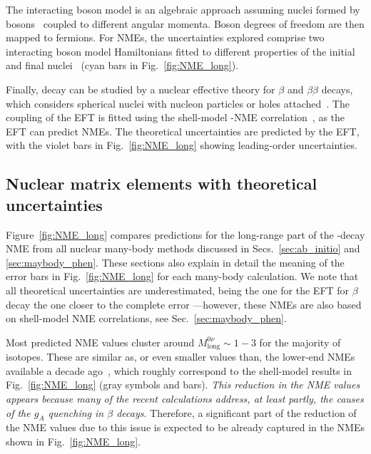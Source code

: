 The interacting boson model is an algebraic approach assuming nuclei formed by bosons~\cite{Iachello:2006fqa} coupled to different angular momenta. Boson degrees of freedom are then mapped to fermions. For NMEs, the uncertainties explored comprise two interacting boson model Hamiltonians fitted to different properties of the initial and final nuclei~\cite{Barea:2015kwa,Deppisch:2020ztt} (cyan bars in Fig.~\ref{fig:NME_long}).

Finally, \bbonu decay can be studied by a nuclear effective theory for $\beta$ and $\beta\beta$ decays, which considers spherical nuclei with nucleon particles or holes attached~\cite{CoelloPerez:2017xsq,Brase:2021uny}. The coupling of the EFT is fitted using the shell-model \bbonu-\bbtnu NME correlation~\cite{Shimizu:2017qcy}, as the EFT can predict \bbtnu NMEs. The theoretical uncertainties are predicted by the EFT, with the violet bars in Fig.~\ref{fig:NME_long} showing leading-order uncertainties.

\subsection{Nuclear matrix elements with theoretical uncertainties}
\label{subsec:nme_current}

Figure~\ref{fig:NME_long} compares predictions for the long-range part of the \bbonu-decay NME from all nuclear many-body methods discussed in Secs.~\ref{sec:ab_initio} and \ref{sec:maybody_phen}. These sections also explain in detail the meaning of the error bars in Fig.~\ref{fig:NME_long} for each many-body calculation. We note that all theoretical uncertainties are underestimated, being the one for the EFT for $\beta$ decay the one closer to the complete error ---however, these NMEs are also based on shell-model NME correlations, see Sec.~\ref{sec:maybody_phen}.

Most predicted NME values cluster around $M^{0\nu}_\text{long}\sim1-3$ for the majority of isotopes. These are similar as, or even smaller values than, the lower-end NMEs available a decade ago~\cite{Gomez-Cadenas:2010zcc}, which roughly correspond to the shell-model results in Fig.~\ref{fig:NME_long} (gray symbols and bars). {\it This reduction in the NME values appears because many of the recent calculations address, at least partly, the causes of the $g_A$ quenching in $\beta$ decays}. Therefore, a significant part of the reduction of the NME values due to this issue is expected to be already captured in the NMEs shown in Fig.~\ref{fig:NME_long}.

